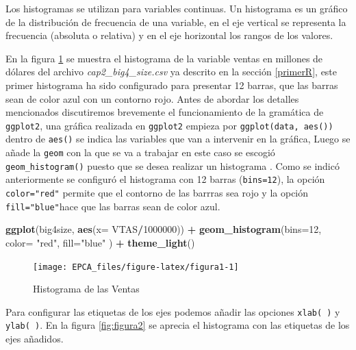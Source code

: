 \documentclass[
]{krantz}
\makeatletter
\newenvironment{Shaded}{\begin{snugshade}}{\end{snugshade}}
\newcommand{\DataTypeTok}[1]{\textcolor[rgb]{0.27,0.27,0.27}{#1}}
\newcommand{\DecValTok}[1]{\textcolor[rgb]{0.06,0.06,0.06}{#1}}
\newcommand{\KeywordTok}[1]{\textcolor[rgb]{0.27,0.27,0.27}{\textbf{#1}}}
\newcommand{\NormalTok}[1]{#1}
\newcommand{\OperatorTok}[1]{\textcolor[rgb]{0.43,0.43,0.43}{\textbf{#1}}}
\newcommand{\StringTok}[1]{\textcolor[rgb]{0.5,0.5,0.5}{#1}}
\newenvironment{kframe}{%
\medskip{}
\setlength{\fboxsep}{.8em}
 \def\at@end@of@kframe{}%
 \ifinner\ifhmode%
  \def\at@end@of@kframe{\end{minipage}}%
  \begin{minipage}{\columnwidth}%
 \fi\fi%
 \def\FrameCommand##1{\hskip\@totalleftmargin \hskip-\fboxsep
 \colorbox{shadecolor}{##1}\hskip-\fboxsep
     \hskip-\linewidth \hskip-\@totalleftmargin \hskip\columnwidth}%
 \MakeFramed {\advance\hsize-\width
   \@totalleftmargin\z@ \linewidth\hsize
   \@setminipage}}%
 {\par\unskip\endMakeFramed%
 \at@end@of@kframe}
\renewenvironment{Shaded}{\begin{kframe}}{\end{kframe}}
\makeatother
\begin{document}
Los histogramas se utilizan para variables continuas. Un histograma es un gráfico de la distribución de frecuencia de una variable, en el eje vertical se representa la frecuencia (absoluta o relativa) y en el eje horizontal los rangos de los valores.

En la figura \ref{fig:figura1} se muestra el histograma de la variable ventas en millones de dólares del archivo \emph{cap2\_big4\_size.csv} ya descrito en la sección \ref{primerR}, este primer histograma ha sido configurado para presentar 12 barras, que las barras sean de color azul con un contorno rojo. Antes de abordar los detalles mencionados discutiremos brevemente el funcionamiento de la gramática de \texttt{ggplot2}, una gráfica realizada en \texttt{ggplot2} empieza por \texttt{ggplot(data,\ aes())} dentro de \texttt{aes()} se indica las variables que van a intervenir en la gráfica, Luego se añade la \texttt{geom} con la que se va a trabajar en este caso se escogió \texttt{geom\_histogram()} puesto que se desea realizar un histograma \citep{hitchhiker2017}. Como se indicó anteriormente se configuró el histograma con 12 barras (\texttt{bins=12}), la opción \texttt{color="red"} permite que el contorno de las barrras sea rojo y la opción \texttt{fill="blue"}hace que las barras sean de color azul.

\begin{Shaded}
\begin{Highlighting}[]
\KeywordTok{ggplot}\NormalTok{(big4size, }\KeywordTok{aes}\NormalTok{(}\DataTypeTok{x=}\NormalTok{ VTAS}\OperatorTok{/}\DecValTok{1000000}\NormalTok{)) }\OperatorTok{+}\StringTok{ }
\StringTok{  }\KeywordTok{geom_histogram}\NormalTok{(}\DataTypeTok{bins=}\DecValTok{12}\NormalTok{, }\DataTypeTok{color=} \StringTok{"red"}\NormalTok{, }\DataTypeTok{fill=}\StringTok{"blue"}\NormalTok{ ) }\OperatorTok{+}\StringTok{ }
\StringTok{  }\KeywordTok{theme_light}\NormalTok{()}
\end{Highlighting}
\end{Shaded}

\begin{figure}[h!]

{\centering \texttt{[image: EPCA\_files/figure-latex/figura1-1]} 

}

\caption{Histograma de las Ventas}\label{fig:figura1}
\end{figure}

Para configurar las etiquetas de los ejes podemos añadir las opciones \texttt{xlab(\ )} y \texttt{ylab(\ )}. En la figura \ref{fig:figura2} se aprecia el histograma con las etiquetas de los ejes añadidos.
\end{document}
